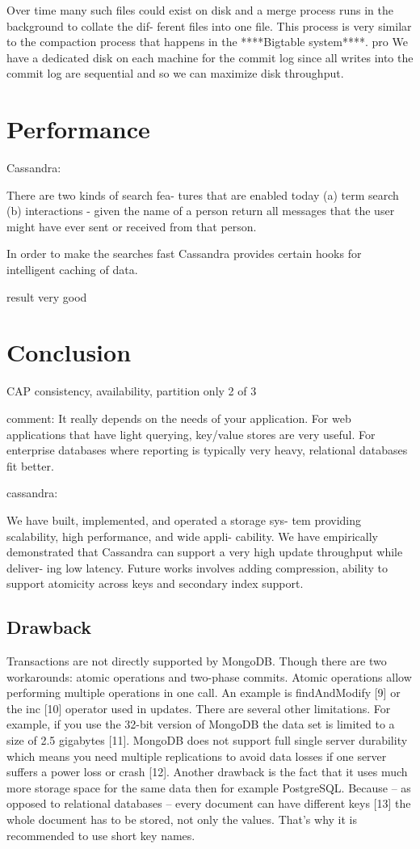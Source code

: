 \documentclass[12pt,letter]{article}
\begin{document}
Over time many such files could exist on disk and a merge process runs in the background to collate the dif- ferent files into one file. This process is very similar to the compaction process that happens in the   ****Bigtable system****.
pro
We have a dedicated disk on each machine for the commit log since all writes into the commit log are sequential and so we can maximize disk throughput.

\section{Performance}

Cassandra:

There are two kinds of search fea- tures that are enabled today (a) term search (b) interactions - given the name of a person return all messages that the user might have ever sent or received from that person.

In order to make the searches fast Cassandra provides certain hooks for intelligent caching of data.

result
very good

\section{Conclusion}
CAP consistency, availability, partition
only 2 of 3

comment:
It really depends on the needs of your application. For web applications that have light querying, key/value stores are very useful. For enterprise databases where reporting is typically very heavy, relational databases fit better. 


cassandra:

We have built, implemented, and operated a storage sys- tem providing scalability, high performance, and wide appli- cability. We have empirically demonstrated that Cassandra can support a very high update throughput while deliver- ing low latency. Future works involves adding compression, ability to support atomicity across keys and secondary index support.


\subsection{Drawback}
Transactions are not directly supported by MongoDB. Though there are two workarounds: atomic operations and two-phase commits. Atomic operations allow performing multiple operations in one call. An example is findAndModify [9] or the inc [10] operator used in updates.
There are several other limitations. For example, if you use the 32-bit version of MongoDB the data set is limited to a size of 2.5 gigabytes [11]. MongoDB does not support full single server durability which means you need multiple replications to avoid data losses if one server suffers a power loss or crash [12]. Another drawback is the fact that it uses much more storage space for the same data then for example PostgreSQL. Because – as opposed to relational databases – every document can have different keys [13] the whole document has to be stored, not only the values. That’s why it is recommended to use short key names.


\end{document}
